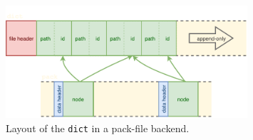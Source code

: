 \begin{figure}[ht]
  \caption{Layout of the \texttt{dict} in a pack-file backend.}
  \label{fig:dict}

  \centering
  \vspace{-1em}
  \includegraphics[width=0.8\textwidth]{images/dict.pdf}
\end{figure}

